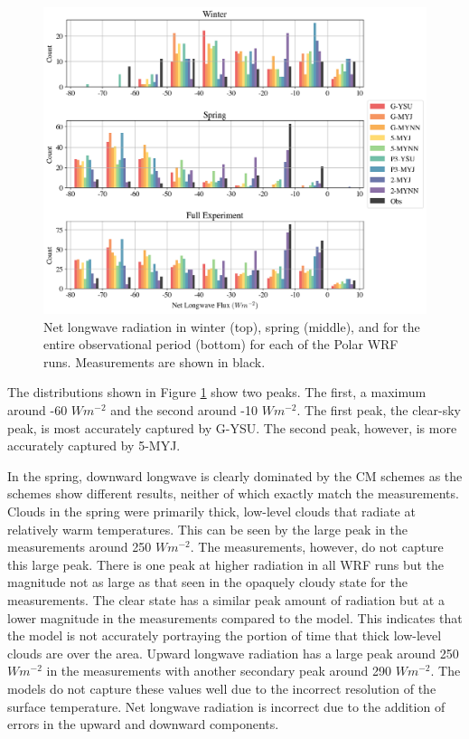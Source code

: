 \begin{figure}[H]
    \centering
    \includegraphics[width=1\linewidth]{figures/chapter3/WRF_NetLW_Histo.png}
    \caption[Polar WRF simulation net longwave radiation histograms]{Net longwave radiation in winter (top), spring (middle), and for the entire observational period (bottom) for each of the Polar WRF runs. Measurements are shown in black.}
    \label{fig:wrf_netlw}
\end{figure}
 
 The distributions shown in Figure \ref{fig:wrf_netlw} show two peaks. The first, a maximum around -60 $Wm^{-2}$ and the second around -10 $Wm^{-2}$. The first peak, the clear-sky peak, is most accurately captured by G-YSU. The second peak, however, is more accurately captured by 5-MYJ. 

In the spring, downward longwave is clearly dominated by the CM schemes as the schemes show different results, neither of which exactly match the measurements. Clouds in the spring were primarily thick, low-level clouds that radiate at relatively warm temperatures. This can be seen by the large peak in the measurements around 250 $Wm^{-2}$. The measurements, however, do not capture this large peak. There is one peak at higher radiation in all WRF runs but the magnitude not as large as that seen in the opaquely cloudy state for the measurements. The clear state has a similar peak amount of radiation but at a lower magnitude in the measurements compared to the model. This indicates that the model is not accurately portraying the portion of time that thick low-level clouds are over the area. Upward longwave radiation has a large peak around 250 $Wm^{-2}$ in the measurements with another secondary peak around 290 $Wm^{-2}$. The models do not capture these values well due to the incorrect resolution of the surface temperature. Net longwave radiation is incorrect due to the addition of errors in the upward and downward components. 

